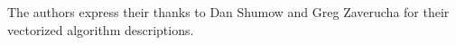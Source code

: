 \documentclass[twocolumn]{svjour3}          %
\begin{document}
%
%
%
%
%


\begin{acknowledgements}
The authors express their thanks to Dan Shumow and Greg Zaverucha for their vectorized
algorithm descriptions.
\end{acknowledgements}


\end{document}
